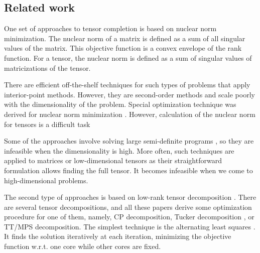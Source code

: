 \subsection{Related work}
\label{sec:related_works}
One set of approaches to tensor completion is based on nuclear norm minimization. The nuclear norm of a matrix is defined as a sum of all singular values of the matrix. This objective function is a convex envelope of the rank function. For a tensor, the nuclear norm is defined as a sum of singular values of matricizations of the tensor.

There are efficient off-the-shelf techniques for such types of problems that apply interior-point methods. However, they are second-order methods and scale poorly with the dimensionality of the problem. Special optimization technique was derived for nuclear norm minimization
\citep{gandy2011tensor, liu2013tensor, recht2010guaranteed,yuan2016tensor}.
However, calculation of the nuclear norm for tensors is a difficult task \citep{hillar2013most}


Some of the approaches involve solving large semi-definite programs \citep{barak2016noisy,potechin2017exact},
so they are infeasible when the dimensionality is high.
More often, such techniques are applied to matrices or
low-dimensional tensors as their straightforward
formulation allows finding the full tensor.
It becomes infeasible when we come to high-dimensional problems.



The second type of approaches is based on low-rank tensor decomposition \citep{acar2011scalable, chen2013simultaneous, kressner2014low, steinlechner2016riemannian, yuan2017completion}. There are several tensor decompositions, and all these papers derive some optimization procedure for one of them, namely, CP decomposition, Tucker decomposition
\citep{kolda2009tensor}, or TT/MPS decomposition. The simplest technique is the alternating least squares \citep{grasedyck2015alternating}.
It finds the solution iteratively at each iteration, minimizing the objective function w.r.t. one core while other cores are fixed.

